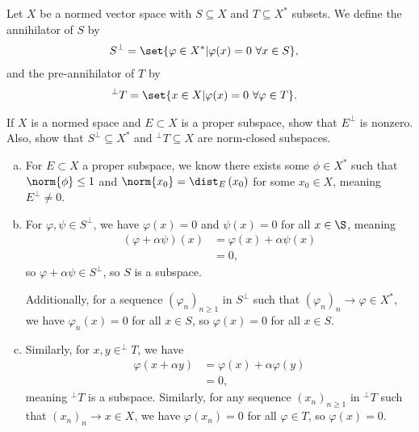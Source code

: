 \documentclass[10pt]{mypackage}
\begin{document}
  \begin{definition}
    Let $X$ be a normed vector space with $S\subseteq X$ and $T\subseteq X^{\ast}$ subsets. We define the annihilator of $S$ by
    \begin{align*}
      S^{\perp} &= \set{\varphi\in X^{\ast}| \varphi(x)= 0~\forall x\in S},
    \end{align*}
    and the pre-annihilator of $T$ by
    \begin{align*}
      ^{\perp}T &= \set{x\in X| \varphi(x) = 0~\forall \varphi \in T}.
    \end{align*}
  \end{definition}
  \begin{exercise}
    If $X$ is a normed space and $E\subset X$ is a proper subspace, show that $E^{\perp}$ is nonzero. Also, show that $S^{\perp}\subseteq X^{\ast}$ and $^{\perp}T\subseteq X$ are norm-closed subspaces.
  \end{exercise}
  \begin{solution}\hfill
    \begin{enumerate}[(a)]
      \item For $E\subset X$ a proper subspace, we know there exists some $\phi\in X^{\ast}$ such that $\norm{\phi} \leq 1$ and $\norm{x_0} = \dist_{E}\left(x_0\right)$ for some $x_0\in X$, meaning $E^{\perp}\neq 0$.
      \item For $\varphi,\psi\in S^{\perp}$, we have $\varphi(x) = 0$ and $\psi(x) = 0$ for all $x\in \S$, meaning
        \begin{align*}
          \left(\varphi + \alpha \psi\right)\left(x\right) &= \varphi(x) + \alpha \psi(x)\\
                                                           &= 0,
        \end{align*}
        so $\varphi + \alpha \psi\in S^{\perp}$, so $S$ is a subspace.\newline

        Additionally, for a sequence $\left(\varphi_n\right)_{n\geq 1} $ in $S^{\perp}$ such that $\left(\varphi_{n}\right)_n\rightarrow \varphi\in X^{\ast}$, we have $\varphi_n(x) = 0$ for all $x\in S$, so $\varphi(x) = 0$ for all $x\in S$.
      \item Similarly, for $x,y\in ^{\perp}T$, we have
        \begin{align*}
          \varphi\left(x + \alpha y\right) &= \varphi(x) + \alpha\varphi(y)\\
                                           &= 0,
        \end{align*}
        meaning $^{\perp}T$ is a subspace. Similarly, for any sequence $\left(x_n\right)_{n\geq 1}$ in $^{\perp}T$ such that $\left(x_n\right)_n\rightarrow x\in X$, we have $\varphi\left(x_n\right) = 0$ for all $\varphi \in T$, so $\varphi(x) = 0$.
    \end{enumerate}
  \end{solution}
\end{document}
